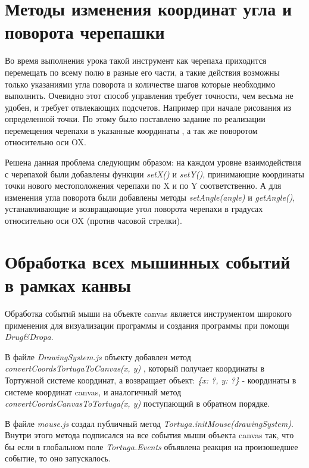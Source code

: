 \chapter{Методы изменения координат угла и поворота черепашки} \label{chapt1}
Во время выполнения урока такой инструмент как черепаха приходится перемещать по всему полю в разные его части, а такие действия возможны только указаниями угла поворота и количестве шагов которые необходимо выполнить. Очевидно этот способ управления требует точности, чем весьма не удобен, и требует отвлекающих подсчетов. Например при начале рисования из определенной точки. По этому было поставлено задание по реализации перемещения черепахи в указанные координаты , а так же поворотом относительно оси OX.

Решена данная проблема следующим образом: на каждом уровне взаимодействия с  черепахой были добавлены функции \textit{setX()} и \textit{setY()},  принимающие координаты точки нового местоположения черепахи по X и по Y  соответственно. А для изменения угла поворота были добавлены методы \textit{setAngle(angle)} и \textit{getAngle()}, устанавливающие и возвращающие угол поворота черепахи в градусах относительно оси OX (против часовой стрелки). 



\chapter{Обработка всех мышинных событий в рамках канвы} \label{chapt1}

Обработка событий мыши на объекте canvas является инструментом  широкого применения для визуализации программы и создания программы при помощи \textit{Drug\&Dropa}.

В файле \textit{DrawingSystem.js}  объекту добавлен  метод \textit{convertCoordsTortugaToCanvas(x, y)} , который получает координаты в Тортужной системе координат, а возвращает объект: \textit{\{x: ?, y: ?\}} - координаты в системе координат canvas, и аналогичный метод \textit{convertCoordsCanvasToTortuga(x, y)}  поступающий в обратном порядке.

В файле \textit{mouse.js} создал публичный метод \textit{Tortuga.initMouse(drawingSystem)}. Внутри этого метода подписался на все события мыши объекта canvas так, что бы  если в глобальном поле \textit{Tortuga.Events} объявлена реакция на произошедшее событие, то оно запускалось.


